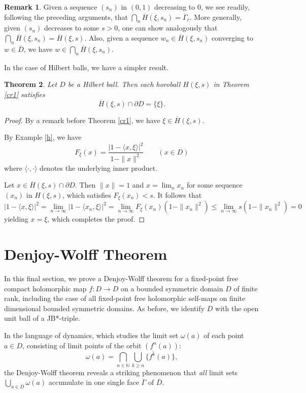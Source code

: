\documentclass[12pt, twoside]{article}
\newtheorem{theorem}{Theorem}[section]
\theoremstyle{definition}
\newtheorem{remark}[theorem]{Remark}
\numberwithin{equation}{section}
\begin{document}
\begin{remark}\label{cr2}
Given a sequence $(s_n)$ in $(0,1)$ decreasing to $0$, we see readily, following the preceding arguments, that
$\bigcap_n \overline H(\xi,s_n) = \overline \Gamma_c$.
More generally, given $(s_n)$ decreases to some $s>0$, one can show analogously that
$\bigcap_n \overline H(\xi,s_n) = \overline H(\xi, s)$.  Also, given a sequence $w_n \in \overline H(\xi, s_n)$
converging to $w \in \overline D$, we have $w\in \bigcap_n \overline H(\xi,s_n)$.
\end{remark}

In the case of Hilbert balls, we have a simpler result.

\begin{theorem}\label{1ptintersection} Let  $D$ be a  Hilbert ball. Then each horoball $H(\xi,s)$ in Theorem \ref{cr1}
  satisfies
 $$\overline{H}(\xi, s) \cap \partial D
=\{\xi\}.$$
\end{theorem}
\begin{proof}
 By a remark before Theorem \ref{cr1}, we have $\xi \in \overline{H}(\xi,s)$.

By Example \ref{h}, we have
$$F_\xi(x)= \frac{|1-\langle x, \xi\rangle|^2}{1-\|x\|^2} \qquad (x\in D)$$
where $\langle \cdot, \cdot\rangle$ denotes the underlying inner product.

Let $x\in \overline{H}(\xi,s)  \cap \partial  D$. Then $\|x\|=1$ and $x=\lim_n x_n$ for some sequence
$(x_n)$ in $H(\xi,s)$, which  satisfies $F_\xi(x_n)<s $. It follows that
$$|1-\langle x,\xi\rangle|^2=\lim_{n\rightarrow \infty} |1-\langle x_n,\xi\rangle|^2
= \lim_{n\rightarrow \infty}F_\xi(x_n) (1-\|x_n\|^2) \leq \lim_{n\rightarrow \infty}s(1-\|x_n\|^2) = 0$$
 yielding $x=\xi$, which completes the proof.
\end{proof}


\section{Denjoy-Wolff Theorem}

In this final section, we prove a Denjoy-Wolff theorem for a fixed-point free compact holomorphic map $f: D \longrightarrow D$
on a bounded symmetric domain $D$ of finite rank, including the case of all fixed-point free
holomorphic self-maps on finite dimensional bounded symmetric domains. As before, we identify $D$ with the open unit ball
of a JB*-triple.

In the language of dynamics,
which studies the limit set
$\omega(a)$ of each point $a\in D$,
consisting of limit points of  the orbit $(f^n(a))$:
 $$\omega(a)=\bigcap_{n\in \mathbb{N}} \overline{\bigcup_{k\geq n}\{f^k(a)\}},$$
the Denjoy-Wolff theorem
reveals a striking phenomenon that {\it all} limit sets $\bigcup_{a\in D} \omega(a)$
accumulate in one single face $\overline\Gamma$
of $\overline D$.
\end{document}
